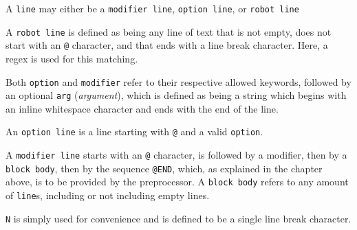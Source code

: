 A \verb|line| may either be a \verb|modifier line|, \verb|option line|, or \verb|robot line|

A \verb|robot line| is defined as being any line of text that is not empty, does not start with an \verb|@| character, and that ends with a line break character. Here, a \gls{regex} is used for this matching.

Both \verb|option| and \verb|modifier| refer to their respective allowed keywords, followed by an optional \verb|arg| (\textit{argument}), which is defined as being a string which begins with an inline whitespace character and ends with the end of the line.

An \verb|option line| is a line starting with \verb|@| and a valid \verb|option|.

A \verb|modifier line| starts with an \verb|@| character, is followed by a modifier, then by a \verb|block body|, then by the sequence \verb|@END|, which, as explained in the chapter above, is to be provided by the preprocessor. A \verb|block body| refers to any amount of \verb|line|s, including or not including empty lines. 

\verb|N| is simply used for convenience and is defined to be a single line break character. 
